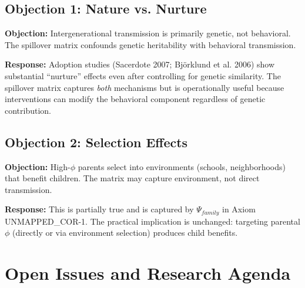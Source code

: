 \subsection{Objection 1: Nature vs. Nurture}

\textbf{Objection:} Intergenerational transmission is primarily genetic, not behavioral.
The spillover matrix confounds genetic heritability with behavioral transmission.

\textbf{Response:} Adoption studies (Sacerdote 2007; Björklund et al. 2006) show substantial
``nurture'' effects even after controlling for genetic similarity. The spillover matrix
captures \textit{both} mechanisms but is operationally useful because interventions can
modify the behavioral component regardless of genetic contribution.

\subsection{Objection 2: Selection Effects}

\textbf{Objection:} High-$\phi$ parents select into environments (schools, neighborhoods)
that benefit children. The matrix may capture environment, not direct transmission.

\textbf{Response:} This is partially true and is captured by $\Psi_{family}$ in Axiom UNMAPPED_COR-1.
The practical implication is unchanged: targeting parental $\phi$ (directly or via
environment selection) produces child benefits.


\section{Open Issues and Research Agenda}
\label{sec:BI-open}

